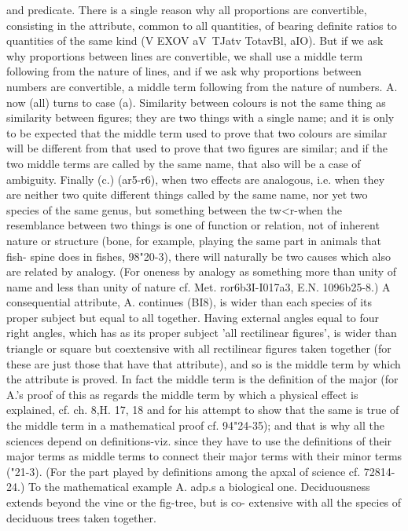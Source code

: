 {{{{{{{{{{{{{{{{{{{{{{{{{{{{{{{{{{{{{{{{{{{{{{{{{{{{{{{{{{{{{{{{{{{{{{{{and predicate. There is a single reason why all proportions are
convertible, consisting in the attribute, common to all quantities,
of bearing definite ratios to quantities of the same kind (V EXOV
aV~TJatv TotavBl, aIO). But if we ask why proportions between lines
are convertible, we shall use a middle term following from the
nature of lines, and if we ask why proportions between numbers are
convertible, a middle term following from the nature of numbers.
A. now (all) turns to case (a). Similarity between colours is not
the same thing as similarity between figures; they are two things
with a single name; and it is only to be expected that the middle
term used to prove that two colours are similar will be different
from that used to prove that two figures are similar; and if the
two middle terms are called by the same name, that also will be
a case of ambiguity.
Finally (c.) (ar5-r6), when two effects are analogous, i.e. when
they are neither two quite different things called by the same
name, nor yet two species of the same genus, but something
between the tw<r-when the resemblance between two things is
one of function or relation, not of inherent nature or structure
(bone, for example, playing the same part in animals that fish-
spine does in fishes, 98"20-3), there will naturally be two causes
which also are related by analogy. (For oneness by analogy as
something more than unity of name and less than unity of nature
cf. Met. ror6b3I-I017a3, E.N. 1096b25-8.)
A consequential attribute, A. continues (BI8), is wider than
each species of its proper subject but equal to all together.
Having external angles equal to four right angles, which has as its
proper subject 'all rectilinear figures', is wider than triangle or
square but coextensive with all rectilinear figures taken together
(for these are just those that have that attribute), and so is the
middle term by which the attribute is proved. In fact the middle
term is the definition of the major (for A.'s proof of this as regards
the middle term by which a physical effect is explained, cf. ch. 8,H. 17, 18
and for his attempt to show that the same is true of the middle
term in a mathematical proof cf. 94"24-35); and that is why all
the sciences depend on definitions-viz. since they have to use
the definitions of their major terms as middle terms to connect
their major terms with their minor terms ("21-3). (For the part
played by definitions among the apxal of science cf. 72814-24.)
To the mathematical example A. adp.s a biological one.
Deciduousness extends beyond the vine or the fig-tree, but is co-
extensive with all the species of deciduous trees taken together.
}}}}}}}}}}}}}}}}}}}}}}}}}}}}}}}}}}}}}}}}}}}}}}}}}}}}}}}}}}}}}}}}}}}}}}}}
